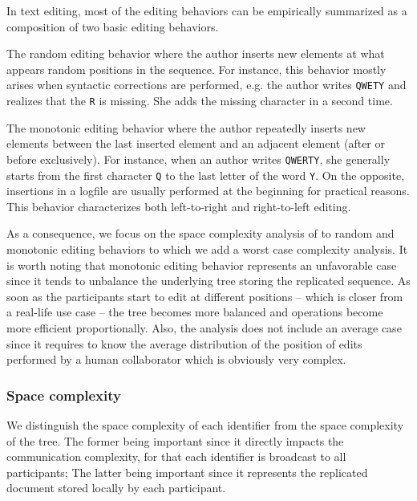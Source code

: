 In text editing, most of the editing behaviors can be empirically summarized
as a composition of two basic editing behaviors.
\begin{inparaenum}[(i)]
\item The random editing behavior where the author inserts new elements at what
  appears random positions in the sequence. For instance, this behavior mostly
  arises when syntactic corrections are performed, e.g. the author writes
  \texttt{QWETY} and realizes that the \texttt{R} is missing. She adds the
  missing character in a second time.
\item The monotonic editing behavior where the author repeatedly inserts new
  elements between the last inserted element and an adjacent element (after or
  before exclusively). For instance, when an author writes \texttt{QWERTY}, she
  generally starts from the first character \texttt{Q} to the last letter of the
  word \texttt{Y}. On the opposite, insertions in a logfile are usually
  performed at the beginning for practical reasons. This behavior characterizes
  both left-to-right and right-to-left editing.
\end{inparaenum}

As a consequence, we focus on the space complexity analysis of \LSEQ to random
and monotonic editing behaviors to which we add a worst case complexity
analysis. It is worth noting that monotonic editing behavior represents an
unfavorable case since it tends to unbalance the underlying tree storing the
replicated sequence. As soon as the participants start to edit at different
positions -- which is closer from a real-life use case -- the tree becomes more
balanced and operations become more efficient proportionally. Also, the
analysis does not include an average case since it requires to know the average
distribution of the position of edits performed by a human collaborator which is
obviously very complex.

\subsubsection{Space complexity}

We distinguish the space complexity of each identifier from the space complexity
of the tree. The former being important since it directly impacts the
communication complexity, for that each identifier is broadcast to all
participants; The latter being important since it represents the replicated
document stored locally by each participant.

